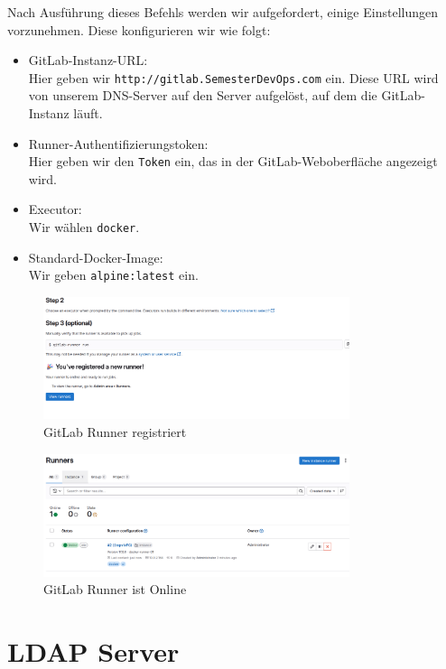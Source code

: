 \documentclass[a4paper,12pt]{article}
\begin{document}
Nach Ausführung dieses Befehls werden wir aufgefordert, einige Einstellungen vorzunehmen. Diese konfigurieren wir wie folgt:
\begin{itemize}
\item GitLab-Instanz-URL: 
	\\ Hier geben wir \texttt{http://gitlab.SemesterDevOps.com} ein. Diese URL wird von unserem DNS-Server auf den Server aufgelöst, auf dem die GitLab-Instanz läuft.
\item Runner-Authentifizierungstoken: 
	\\ Hier geben wir den \texttt{Token} ein, das in der GitLab-Weboberfläche angezeigt wird.
\item Executor: 
	\\ Wir wählen \texttt{docker}.
\item Standard-Docker-Image: 
	\\ Wir geben \texttt{alpine:latest} ein.
\end{itemize}

\begin{figure}[H]
	\centering
	\includegraphics[width=0.8\textwidth]{data/RUNNER_GEHT.png}
	\caption{GitLab Runner registriert}
	\label{fig:GitLab Runner registriert}
\end{figure}
\begin{figure}[H]
	\centering
	\includegraphics[width=0.8\textwidth]{data/RUNNER_ONLINE.png}
	\caption{GitLab Runner ist Online}
	\label{fig:GitLab Runner ist Online}
\end{figure}

\section{LDAP Server}
\end{document}
